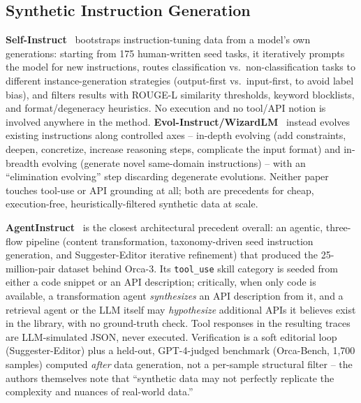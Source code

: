 \documentclass[11pt]{article}
\begin{document}
\subsection{Synthetic Instruction Generation}
\textbf{Self-Instruct}~\cite{wang2022selfinstruct} bootstraps instruction-tuning data from a
model's own generations: starting from 175 human-written seed tasks, it iteratively prompts the
model for new instructions, routes classification vs.\ non-classification tasks to different
instance-generation strategies (output-first vs.\ input-first, to avoid label bias), and filters
results with ROUGE-L similarity thresholds, keyword blocklists, and format/degeneracy heuristics.
No execution and no tool/API notion is involved anywhere in the method.
\textbf{Evol-Instruct/WizardLM}~\cite{xu2023wizardlm} instead evolves existing instructions along
controlled axes -- in-depth evolving (add constraints, deepen, concretize, increase reasoning
steps, complicate the input format) and in-breadth evolving (generate novel same-domain
instructions) -- with an ``elimination evolving'' step discarding degenerate evolutions. Neither
paper touches tool-use or API grounding at all; both are precedents for cheap, execution-free,
heuristically-filtered synthetic data at scale.

\textbf{AgentInstruct}~\cite{mitra2024agentinstruct} is the closest architectural precedent overall:
an agentic, three-flow pipeline (content transformation, taxonomy-driven seed instruction
generation, and Suggester-Editor iterative refinement) that produced the 25-million-pair dataset
behind Orca-3. Its \texttt{tool\_use} skill category is seeded from either a code snippet or an
API description; critically, when only code is available, a transformation agent
\textit{synthesizes} an API description from it, and a retrieval agent or the LLM itself may
\textit{hypothesize} additional APIs it believes exist in the library, with no ground-truth check.
Tool responses in the resulting traces are LLM-simulated JSON, never executed. Verification is a
soft editorial loop (Suggester-Editor) plus a held-out, GPT-4-judged benchmark (Orca-Bench, 1,700
samples) computed \textit{after} data generation, not a per-sample structural filter -- the authors
themselves note that ``synthetic data may not perfectly replicate the complexity and nuances of
real-world data.''
\end{document}
